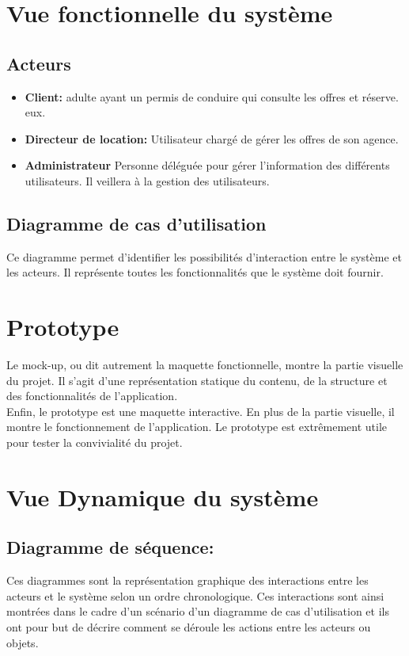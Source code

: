 \documentclass[12pt,a4paper]{report}
\begin{document}
		\section{Vue fonctionnelle du système}
			\subsection{Acteurs}
			\begin{itemize}
				\item \textbf{Client:} adulte ayant un permis de conduire qui consulte les offres et réserve. eux.
				\item \textbf{Directeur de location:} Utilisateur chargé de gérer les offres de son agence.
				\item \textbf{Administrateur} Personne déléguée pour gérer l’information des différents utilisateurs. Il veillera à la gestion des utilisateurs.
			\end{itemize}

		

			\subsection{Diagramme de cas d'utilisation}
Ce diagramme permet d’identifier les possibilités d’interaction entre le système et les acteurs. Il représente toutes les fonctionnalités que le système doit fournir.



		\section{Prototype}
Le mock-up, ou dit autrement la maquette fonctionnelle, montre la partie visuelle du projet. Il s’agit d’une représentation statique du contenu, de la structure et des fonctionnalités de l’application.\\
Enfin, le prototype est une maquette interactive. En plus de la partie visuelle, il montre le fonctionnement de l’application. Le prototype est extrêmement utile pour tester la convivialité du projet.
	
			

		\section{Vue Dynamique du système}
			\subsection{Diagramme de séquence:} 
Ces diagrammes sont la représentation graphique des interactions entre les acteurs et le
système selon un ordre chronologique. Ces interactions sont ainsi montrées dans le cadre d'un
scénario d'un diagramme de cas d'utilisation et ils ont pour but de décrire comment se déroule les
actions entre les acteurs ou objets.
			
\end{document}

